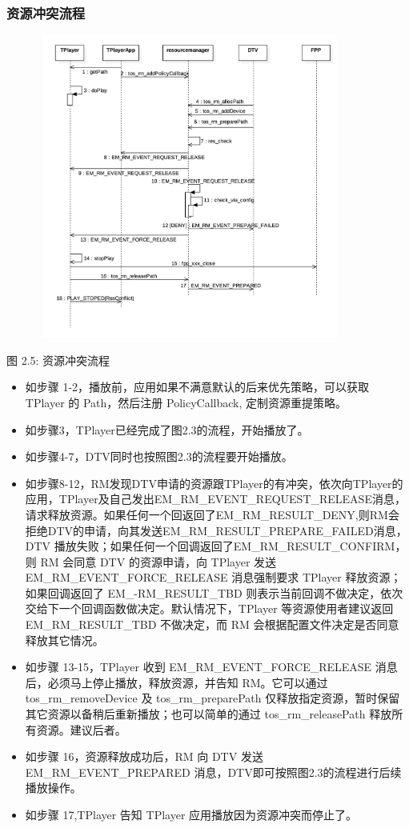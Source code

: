 \documentclass[UTF8]{ctexart}
\begin{document}
\subsubsection{资源冲突流程}
\begin{figure}[h]
\centering
\includegraphics[width=10cm,height=10cm]{4.png}
\end{figure}

\centerline{{图 2.5: 资源冲突流程}}

\begin{itemize}
\item 如步骤 1-2，播放前，应用如果不满意默认的后来优先策略，可以获取 TPlayer 的 Path，然后注册 PolicyCallback, 定制资源重提策略。
\item 如步骤3，TPlayer已经完成了图2.3的流程，开始播放了。\
\item 如步骤4-7，DTV同时也按照图2.3的流程要开始播放。\
\item 如步骤8-12，RM发现DTV申请的资源跟TPlayer的有冲突，依次向TPlayer的应用，TPlayer及自己发出EM\_RM\_EVENT\_REQUEST\_RELEASE消息，请求释放资源。如果任何一个回返回了EM\_RM\_RESULT\_DENY,则RM会拒绝DTV的申请，向其发送EM\_RM\_RESULT\_PREPARE\_FAILED消息，DTV 播放失败；如果任何一个回调返回了EM\_RM\_RESULT\_CONFIRM，则 RM 会同意 DTV 的资源申请，向 TPlayer 发送 EM\_RM\_EVENT\_FORCE\_RELEASE 消息强制要求 TPlayer 释放资源；如果回调返回了 EM\_-RM\_RESULT\_TBD 则表示当前回调不做决定，依次交给下一个回调函数做决定。默认情况下，TPlayer 等资源使用者建议返回 EM\_RM\_RESULT\_TBD 不做决定，而 RM 会根据配置文件决定是否同意释放其它情况。 \
\item 如步骤 13-15，TPlayer 收到 EM\_RM\_EVENT\_FORCE\_RELEASE 消息后，必须马上停止播放，释放资源，并告知 RM。它可以通过 tos\_rm\_removeDevice 及 tos\_rm\_preparePath 仅释放指定资源，暂时保留其它资源以备稍后重新播放；也可以简单的通过 tos\_rm\_releasePath 释放所有资源。建议后者。\
\item 如步骤 16，资源释放成功后，RM 向 DTV 发送 EM\_RM\_EVENT\_PREPARED 消息，DTV即可按照图2.3的流程进行后续播放操作。\
\item 如步骤 17,TPlayer 告知 TPlayer 应用播放因为资源冲突而停止了。\
\end{itemize}
\end{document}
